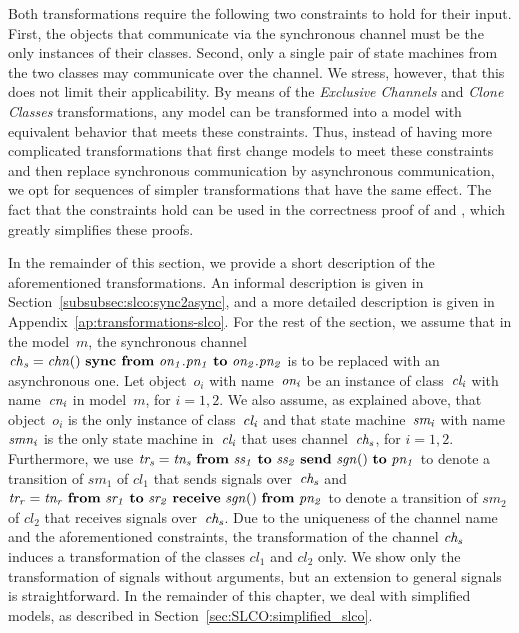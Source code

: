 Both transformations require the following two constraints to hold for their input.
First, the objects that communicate via the synchronous channel must be the only instances of their classes.
Second, only a single pair of state machines from the two classes may communicate over the channel.
We stress, however, that this does not limit their applicability.
By means of the \emph{Exclusive Channels} and \emph{Clone Classes} transformations, any \SLCO model can be transformed into a model with equivalent behavior that meets these constraints.
Thus, instead of having more complicated transformations that first change models to meet these constraints and then replace synchronous communication by asynchronous communication, we opt for sequences of simpler transformations that have the same effect.
The fact that the constraints hold can be used in the correctness proof of \TSim and \TGen, which greatly simplifies these proofs.

In the remainder of this section, we provide a short description of the aforementioned transformations.
An informal description is given in Section~\ref{subsubsec:slco:sync2async}, and a more detailed description is given in Appendix~\ref{ap:transformations-slco}.
For the rest of the section, we assume that in the model~$m$,
the synchronous channel $\it{ch}_s = \it{chn}()~\textbf{sync from}~\it{on_1}.\it{pn_1}~\textbf{to}~\it{on_2}.\it{pn_2}$ is to be replaced with an asynchronous one.
Let object~$o_i$ with name~$\it{on_i}$ be an instance of class~$\it{cl_i}$ with name~$\it{cn_i}$ in model~$m$, for $i=1,2$.
We also assume, as explained above, that object~$o_i$ is the only instance of class~$\it{cl_i}$ and that state machine~$\it{sm_i}$ with name~$\it{smn_i}$ is the only state machine in~$\it{cl_i}$ that uses channel~$\it{ch_s}$, for $i=1,2$.
Furthermore, we use $\it{tr_s} = \it{tn_s}~\textbf{from}~\it{ss_1}~\textbf{to}~\it{ss_2}~\textbf{send}~\it{sgn}()~\textbf{to}~\it{pn_1}$ to denote a transition
of $sm_1$ of $cl_1$ that sends signals over~$\it{ch_s}$ and $\it{tr_r} = \it{tn_r}~\textbf{from}~\it{sr_1}~\textbf{to}~\it{sr_2}~\textbf{receive}~\it{sgn}()~\textbf{from}~\it{pn_2}$ to denote a transition of $sm_2$ of $cl_2$ that receives signals over~$\it{ch_s}$.
Due to the uniqueness of the channel name and the aforementioned constraints, the transformation of the channel $\it{ch_s}$ induces a transformation of the classes $cl_1$ and $cl_2$ only.
We show only the transformation of signals without arguments, but an extension to general signals is straightforward.
In the remainder of this chapter, we deal with simplified \SLCO models, as described in Section~\ref{sec:SLCO:simplified_slco}.



